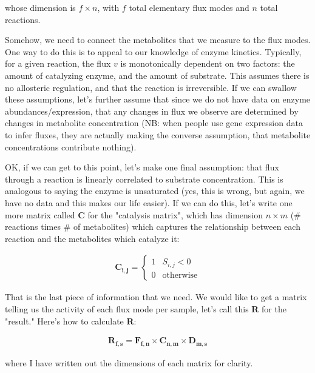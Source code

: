 \documentclass[10pt]{article}
\begin{document}
\noindent whose dimension is $f \times n$, with $f$ total elementary flux modes and $n$ total reactions.

Somehow, we need to connect the metabolites that we measure to the flux modes. One way to do this is to appeal to our knowledge of enzyme kinetics. Typically, for a given reaction, the flux $v$ is monotonically dependent on two factors: the amount of catalyzing enzyme, and the amount of substrate. This assumes there is no allosteric regulation, and that the reaction is irreversible. If we can swallow these assumptions, let's further assume that since we do not have data on enzyme abundances/expression, that any changes in flux we observe are determined by changes in metabolite concentration (NB: when people use gene expression data to infer fluxes, they are actually making the converse assumption, that metabolite concentrations contribute nothing).

OK, if we can get to this point, let's make one final assumption: that flux through a reaction is linearly correlated to substrate concentration. This is analogous to saying the enzyme is unsaturated (yes, this is wrong, but again, we have no data and this makes our life easier). If we can do this, let's write one more matrix called $\mathbf{C}$ for the "catalysis matrix", which has dimension $n \times m$ (\# reactions times \# of metabolites) which captures the relationship between each reaction and the metabolites which catalyze it:

\begin{align*}
\mathbf{C_{i,j}} =  
\begin{cases} 
1 & S_{i,j} < 0 \\ 
0 & \text{otherwise}
\end{cases}
\end{align*}

That is the last piece of information that we need. We would like to get a matrix telling us the activity of each flux mode per sample, let's call this $\mathbf{R}$ for the "result." Here's how to calculate $\mathbf{R}$:

\begin{align*}
\mathbf{R_{f,s}} = \mathbf{F_{f,n}} \times \mathbf{C_{n,m}} \times \mathbf{D_{m,s}}
\end{align*}

\noindent where I have written out the dimensions of each matrix for clarity.
\end{document}
